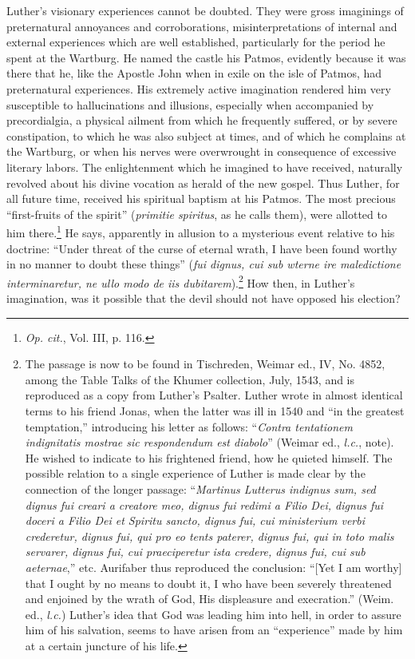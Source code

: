 Luther’s visionary experiences cannot be doubted. They were gross
imaginings of preternatural annoyances and corroborations, misinterpretations
of internal and external experiences which are well established, particularly
for the period he spent at the Wartburg. He
named the castle his Patmos, evidently because it was there that he,
like the Apostle John when in exile on the isle of Patmos, had
preternatural experiences. His extremely active imagination rendered him
very susceptible to hallucinations and illusions, especially
when accompanied by precordialgia, a physical ailment from which
he frequently suffered, or by severe constipation, to which he was
also subject at times, and of which he complains at the Wartburg, or
when his nerves were overwrought in consequence of excessive literary labors.
The enlightenment which he imagined to have received, naturally
revolved about his divine vocation as herald of the new gospel. Thus
Luther, for all future time, received his spiritual baptism at his Patmos.
The most precious “first-fruits of the spirit” (\textit{primitie spiritus},
as he calls them), were allotted to him there.\footnote{\textit{Op. cit.}, Vol. III, p. 116.}
He says, apparently
in allusion to a mysterious event relative to his doctrine: “Under
threat of the curse of eternal wrath, I have been found worthy in no
manner to doubt these things” (\textit{fui dignus, cui sub wterne ire maledictione
interminaretur, ne ullo modo de iis dubitarem}).\footnote
{The passage is now to be found in Tischreden, Weimar ed., IV, No. 4852, among the
Table Talks of the Khumer collection, July, 1543, and is reproduced as a copy from
Luther’s Psalter. Luther wrote in almost identical terms to his friend Jonas, when the latter
was ill in 1540 and “in the greatest temptation,” introducing his letter as follows: “\textit{Contra
tentationem indignitatis mostrae sic respondendum est diabolo}” (Weimar ed., \textit{l.c.}, note). He
wished to indicate to his frightened friend, how he quieted himself. The possible relation
to a single experience of Luther is made clear by the connection of the longer passage:
“\textit{Martinus Lutterus indignus sum, sed dignus fui creari a creatore meo, dignus fui redimi a
Filio Dei, dignus fui doceri a Filio Dei et Spiritu sancto, dignus fui, cui ministerium verbi
crederetur, dignus fui, qui pro eo tents paterer, dignus fui, qui in toto malis servarer,
dignus fui, cui praeciperetur ista credere, dignus fui, cui sub aeternae},” etc. Aurifaber thus
reproduced the conclusion: “[Yet I am worthy] that I ought by no means to doubt it, I
who have been severely threatened and enjoined by the wrath of God, His displeasure and
execration.” (Weim. ed., \textit{l.c.}) Luther’s idea that God was leading him into hell, in order to
assure him of his salvation, seems to have arisen from an “experience” made by him at a
certain juncture of his life.}
How then,
in Luther’s imagination, was it possible that the devil should not have
opposed his election?

